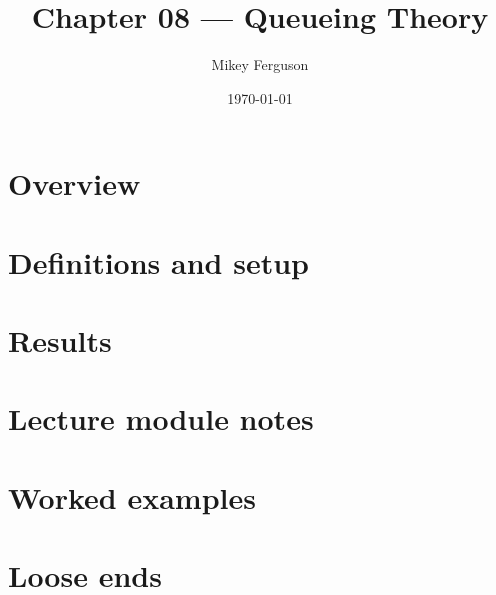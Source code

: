 \documentclass[11pt]{article}
\title{Chapter 08 --- Queueing Theory}
\author{Mikey Ferguson}
\date{\today}
\begin{document}
\maketitle
\tableofcontents
\bigskip

\section{Overview}

\section{Definitions and setup}

\section{Results}

\section{Lecture module notes}

\section{Worked examples}

\section{Loose ends}
\end{document}
